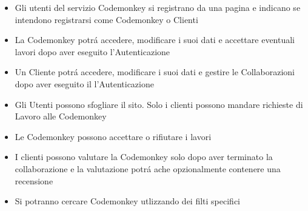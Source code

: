 \begin{itemize}
\large
\item Gli utenti del servizio Codemonkey si registrano da una pagina e indicano se intendono registrarsi come Codemonkey o Clienti
\item La Codemonkey potrá accedere, modificare i suoi dati e accettare eventuali lavori dopo aver eseguito l'Autenticazione
\item Un Cliente potrá accedere, modificare i suoi dati e gestire le Collaborazioni dopo aver eseguito il l'Autenticazione
\item Gli Utenti possono sfogliare il sito. Solo i clienti possono mandare richieste di Lavoro alle Codemonkey
\item Le Codemonkey possono accettare o rifiutare i lavori
\item I clienti possono valutare la Codemonkey solo dopo aver terminato la collaborazione e la valutazione potrá ache opzionalmente contenere una recensione
\item Si potranno cercare Codemonkey utlizzando dei filti specifici
\end{itemize}
